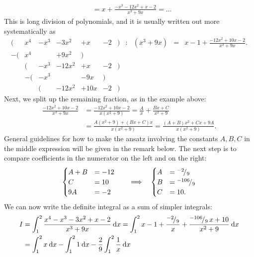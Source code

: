 \begin{example}
\begin{enumerate}[(i)]
\begin{equation*}
\begin{split}
	& = x + \frac{-x^3-12x^2+x-2}{x^3+9x} = \dots
	\end{split}
	\end{equation*}
	This is long division of polynomials, and it is usually written out more systematically as
	\begin{equation*}
	\begin{array}{rrrrrrrrrrr}
		( & x^4 & - x^3 & - 3x^2 & + x & - 2 & ) & : & (x^3+9x) & = & 
											x-1 + \frac{-12x^2+10x-2}{x^3+9x}. \\
	   -( & x^4 &       & + 9x^2 & )   &&&&&& \\
	      &   ( & - x^3 & -12x^2 & + x & - 2 & ) &&&& \\
   	      &  -( & - x^3 &        & -9x & ) &&&&& \\
   	      &     &     ( & -12x^2 &+10x & - 2 & ) &&&&
	\end{array}
	\end{equation*}
	Next, we split up the remaining fraction, as in the example above:
	\begin{equation*}
	\begin{split}
	\frac{-12x^2+10x-2}{x^3+9x} & =\frac{-12x^2+10x-2}{x(x^2+9)}
	= \frac{A}{x} +\frac{Bx+C}{x^2+9} \\
	& = \frac{A(x^2+9)+(Bx+C)x}{x(x^2+9)}
	= \frac{(A+B)x^2+Cx+9A}{x(x^2+9)}.
	\end{split}
	\end{equation*}
	General guidelines for how to make the ansatz involving the constants $A,B,C$ in the middle expression will be given in the remark below. The next step is to compare coefficients in the numerator on the left and on the right:	
	\[ \begin{cases} A+B &= -12 \\ C &= 10 \\ 9A &= -2 \end{cases} 
	\qquad \Longrightarrow \quad 
	\begin{cases} A &= {}^{-2}\!/_{9} \\ B &= {}^{-106}\!/_{9} \\ C &= 10. \end{cases} \]
	We can now write the definite integral as a sum of simpler integrals:
	\begin{equation*}
	\begin{split}
	I & = \itgr{1}{2}{\frac{x^4-x^3-3x^2+x-2}{x^3+9x}}{x}
	= \itgr{1}{2}{x-1+\frac{\rfrac{-2}{9}}{x}+\frac{\rfrac{-106}{9}\,x+10}{x^2+9} }{x} \\
	& = \itgr{1}{2}{x}{x} - \itgr{1}{2}{1}{x} -\frac{2}{9}\itgr{1}{2}{\frac{1}{x}}{x}

\end{split}
\end{equation*}
\end{enumerate}
\end{example}
